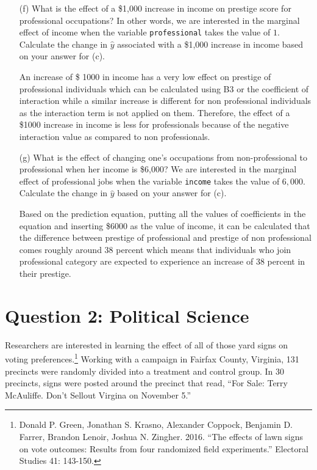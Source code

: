 \documentclass[12pt,letterpaper]{article}
\begin{document}
\begin{enumerate}
	\newpage
	\item [(f)]
	What is the effect of a \$1,000 increase in income on prestige score for professional occupations? In other words, we are interested in the marginal effect of income when the variable \texttt{professional} takes the value of $1$. Calculate the change in $\hat{y}$ associated with a \$1,000 increase in income based on your answer for (c).
	\item[]An increase of  \$ 1000 in income has a very low effect on prestige of professional individuals which can be calculated using B3 or the coefficient of interaction while a similar increase is different for non professional individuals as the
	interaction term is not applied on them. Therefore, the effect of a \$1000 
	increase in income is less for professionals because of the negative interaction
	value as compared to non professionals.
	
	
	
	\vspace{2cm}
	\item [(g)]
	What is the effect of changing one's occupations from non-professional to professional when her income is \$6,000? We are interested in the marginal effect of professional jobs when the variable \texttt{income} takes the value of $6,000$. Calculate the change in $\hat{y}$ based on your answer for (c).
	
	\item[] Based on the prediction equation, putting all the values of coefficients
	in the equation and inserting \$6000 as the value of income, it can be 
	calculated that the difference between prestige of professional and 
	prestige of non professional comes roughly around 38 percent which means that
	individuals who join professional category are expected to experience an
	increase of 38 percent in their prestige.
	
\end{enumerate}

\newpage

\section*{Question 2: Political Science}
\vspace{.25cm}
\noindent 	Researchers are interested in learning the effect of all of those yard signs on voting preferences.\footnote{Donald P. Green, Jonathan	S. Krasno, Alexander Coppock, Benjamin D. Farrer,	Brandon Lenoir, Joshua N. Zingher. 2016. ``The effects of lawn signs on vote outcomes: Results from four randomized field experiments.'' Electoral Studies 41: 143-150. } Working with a campaign in Fairfax County, Virginia, 131 precincts were randomly divided into a treatment and control group. In 30 precincts, signs were posted around the precinct that read, ``For Sale: Terry McAuliffe. Don't Sellout Virgina on November 5.'' \\
\end{document}

